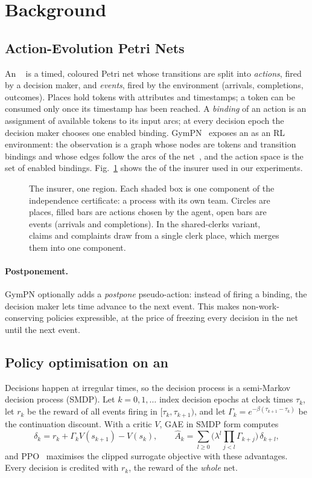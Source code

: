 \section{Background}\label{sec:background}

\subsection{Action-Evolution Petri Nets}
An \aepn~\cite{aepn2023} is a timed, coloured Petri net whose transitions are split
into \emph{actions}, fired by a decision maker, and \emph{events}, fired by the
environment (arrivals, completions, outcomes). Places hold tokens with attributes and
timestamps; a token can be consumed only once its timestamp has been reached. A
\emph{binding} of an action is an assignment of available tokens to its input arcs; at
every decision epoch the decision maker chooses one enabled binding. GymPN~\cite{gympn2025}
exposes an \aepn{} as an RL environment: the observation is a graph whose nodes are
tokens and transition bindings and whose edges follow the arcs of the
net~\cite{aepn_repr2025}, and the action space is the set of enabled bindings.
Fig.~\ref{fig:insurer} shows the \aepn{} of the insurer used in our experiments.

\begin{figure}[t]
\centering
\resizebox{\textwidth}{!}{}
\caption{The insurer, one region. Each shaded box is one component of the
independence certificate: a process with its own team. Circles are places, filled
bars are actions chosen by the agent, open bars are events (arrivals and
completions). In the shared-clerks variant, claims and complaints draw from a single
clerk place, which merges them into one component.}\label{fig:insurer}
\end{figure}

\paragraph{Postponement.} GymPN optionally adds a \emph{postpone} pseudo-action: instead
of firing a binding, the decision maker lets time advance to the next event. This makes
non-work-conserving policies expressible, at the price of freezing every decision in
the net until the next event.

\subsection{Policy optimisation on an \aepn}
Decisions happen at irregular times, so the decision process is a semi-Markov
decision process (SMDP). Let $k=0,1,\dots$ index decision epochs at clock times
$\tau_k$, let $r_k$ be the reward of all events firing in $[\tau_k,\tau_{k+1})$, and
let $\Gamma_k = e^{-\beta(\tau_{k+1}-\tau_k)}$ be the continuation discount. With a
critic $V$, GAE in SMDP form computes
\begin{equation}
  \delta_k = r_k + \Gamma_k V(s_{k+1}) - V(s_k), \qquad
  \hat A_k = \sum_{l\ge 0} \Big(\lambda^l \prod_{j<l} \Gamma_{k+j}\Big)\, \delta_{k+l},
\end{equation}
and PPO~\cite{ppo2017} maximises the clipped surrogate objective with these advantages.
Every decision is credited with $r_k$, the reward of the \emph{whole} net.

